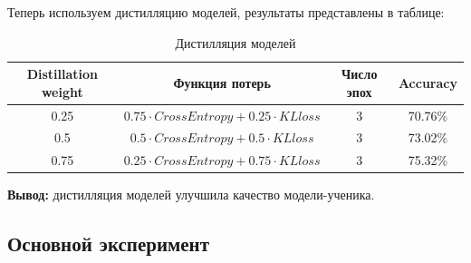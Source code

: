 \documentclass[12pt]{article}
\begin{document}
\newpage
Теперь используем дистилляцию моделей, результаты представлены в таблице:

\begin{table}[htbp]
  \centering
  \begin{tabular}{|c|c|c|c|}
    \hline
    Distillation weight & Функция потерь & Число эпох & Accuracy \\ \hline
    0.25 & $0.75\cdot CrossEntropy+0.25\cdot KLloss$ & 3 & 70.76\% \\ \hline
    0.5 & $0.5\cdot CrossEntropy+0.5\cdot KLloss$ & 3 & 73.02\% \\ \hline
    0.75 & $0.25\cdot CrossEntropy+0.75\cdot KLloss$ & 3 & 75.32\% \\ \hline
  \end{tabular}
  \caption{Дистилляция моделей}
  \label{tab:my-table}
\end{table}

\textbf{Вывод:} дистилляция моделей улучшила качество модели-ученика.



\subsection{Основной эксперимент}




\newpage


\end{document}
